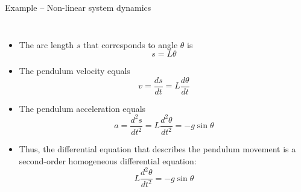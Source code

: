 \begin{frame}{Example – Non-linear system dynamics}
\begin{columns}
\begin{itemize}
     \item The arc length $s$ that corresponds to angle $\theta$ is
    $$s=L\theta$$
     \item The pendulum velocity equals
     $$v = \frac{ds}{dt}=L\frac{d\theta}{dt}$$
     \item The pendulum acceleration equals
     $$a = \frac{d^2s}{dt^2}=L\frac{d^2\theta}{dt^2} = -g\sin{\theta}$$
     \item Thus, the differential equation that describes the pendulum movement is a second-order homogeneous differential equation:
     \vspace{-10pt}
     $$L\frac{d^2\theta}{dt^2} = -g\sin{\theta}$$
 \end{itemize}
\end{columns}
\end{frame}
